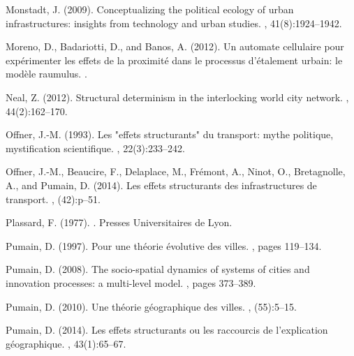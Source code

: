 \documentclass[11pt]{article}
\begin{document}
\begin{thebibliography}{}
Monstadt, J. (2009).
\newblock Conceptualizing the political ecology of urban infrastructures:
  insights from technology and urban studies.
, 41(8):1924--1942.

Moreno, D., Badariotti, D., and Banos, A. (2012).
\newblock Un automate cellulaire pour exp{\'e}rimenter les effets de la
  proximit{\'e} dans le processus d'{\'e}talement urbain: le mod{\`e}le
  raumulus.
.

Neal, Z. (2012).
\newblock Structural determinism in the interlocking world city network.
, 44(2):162--170.

Offner, J.-M. (1993).
\newblock Les "effets structurants" du transport: mythe politique,
  mystification scientifique.
, 22(3):233--242.

Offner, J.-M., Beaucire, F., Delaplace, M., Fr{\'e}mont, A., Ninot, O.,
  Bretagnolle, A., and Pumain, D. (2014).
\newblock Les effets structurants des infrastructures de transport.
, (42):p--51.

Plassard, F. (1977).
.
\newblock Presses Universitaires de Lyon.

Pumain, D. (1997).
\newblock Pour une th{\'e}orie {\'e}volutive des villes.
, pages 119--134.

Pumain, D. (2008).
\newblock The socio-spatial dynamics of systems of cities and innovation
  processes: a multi-level model.
, pages 373--389.

Pumain, D. (2010).
\newblock Une th{\'e}orie g{\'e}ographique des villes.
,
  (55):5--15.

Pumain, D. (2014).
\newblock Les effets structurants ou les raccourcis de l'explication
  g{\'e}ographique.
, 43(1):65--67.


\end{thebibliography}
\end{document}
